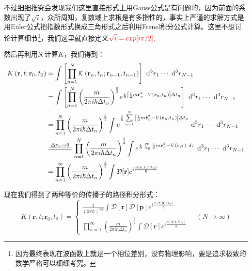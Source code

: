 \documentclass[a4paper,zihao=-4,linespread=1]{ctexrep}
\begin{document}
	不过细细推究会发现我们这里直接形式上用Gauss公式是有问题的，因为前面的系数出现了$\sqrt{i}$，众所周知，复数域上求根是有多指性的，事实上严谨的求解方式是用Euler公式把指数形式换成三角形式之后利用Frenel积分公式计算。这里不想讨论计算细节\footnote{因为最终表现在波函数上就是一个相位差别，没有物理影响，要是追求极致的数学严格可以细细考究。}，我们这里就直接定义${\color{red}\sqrt{i}=exp[i\pi/2]}$.
	
	然后再利用$\mathcal{K}$计算$K$，我们得到：
	\begin{equation}
		\label{eq:6.89}
		\begin{aligned}    K\left( \mathbf{r},t;{{{\mathbf{r}}}_{0}},{{t}_{0}} \right)&=\int{\left[ \prod\limits_{n=1}^{N}{\mathcal{K}\left( {{{\mathbf{r}}}_{n}},{{t}_{n}};{{{\mathbf{r}}}_{n-1}},{{t}_{n-1}} \right)} \right]\mathrm{~d}^3{{{{r}}}_{1}}\cdots \mathrm{~d}^3{{{{r}}}_{N-1}}} \\   & =\int{\left[ \prod\limits_{n=1}^{N}{{{\left( \frac{m}{2\pi i\hbar \Delta {{t}_{n}}} \right)}^{\frac{3}{2}}}{{e}^{\frac{i}{\hbar }\left[ \frac{1}{2}m\dot{\mathbf{r}}_{n}^{2}-V\left( {{{\mathbf{r}}}_{n}},{{t}_{n}} \right) \right]\Delta {{t}_{n}}}}} \right]\mathrm{~d}^3{{{{r}}}_{1}}\cdots \mathrm{~d}^3{{{{r}}}_{N-1}}} \\   & =\prod\limits_{n=1}^{N}{{{\left( \frac{m}{2\pi i\hbar \Delta {{t}_{n}}} \right)}^{\frac{3}{2}}}}\int{{{e}^{\frac{i}{\hbar }\sum\limits_{n=1}^{N}{\left[ \frac{1}{2}m\dot{\mathbf{r}}_{n}^{2}-V\left( {{{\mathbf{r}}}_{n}},{{t}_{n}} \right) \right]\Delta {{t}_{n}}}}}\mathrm{~d}^3{{{{r}}}_{1}}\cdots \mathrm{~d}^3{{{{r}}}_{N-1}}} \\   &  \xlongequal[]{\Delta r_n\to 0}\prod\limits_{n=1}^{N}{{{\left( \frac{m}{2\pi i\hbar \Delta {{t}_{n}}} \right)}^{\frac{3}{2}}}}\int{{{e}^{\frac{i}{\hbar }\int_{{{t}_{0}}}^{t}{\frac{1}{2}m\dot{\mathbf{r}}_{n}^{2}-V\left( \mathbf{r},\tau  \right)\mathrm{~d}\tau }}}\mathrm{~d}^3{{{{r}}}_{1}}\cdots \mathrm{~d}^3{{{{r}}}_{N-1}}} \\   &  =\prod\limits_{n=1}^{\infty}{{{\left( \frac{m}{2\pi i\hbar \Delta {{t}_{n}}} \right)}^{\frac{3}{2}}}}\int{\mathcal{D}[\mathbf{r}]{{e}^{i\frac{S\left( \mathbf{r},\dot{\mathbf{r}},t;t_0 \right)}{\hbar }}}} \\  \end{aligned}
	\end{equation}
	
	现在我们得到了两种等价的传播子的路径积分形式：
	\begin{equation}
		\label{eq:6.90}
		K\left( \mathbf{r},t;{{{\mathbf{r}}}_{0}},{{t}_{0}} \right)=\begin{cases}
			\frac{1}{(2 \pi \hbar)^{3 N}} \int \mathcal{D} [\mathbf{r}] \mathcal{D} [\mathbf{p}]e^{i \frac{S\left(\mathbf{r},\mathbf{p}, t;t_0\right)}{\hbar}}
			\\
			\prod\limits_{n=1}^{\infty}{{{\left( \frac{m}{2\pi i\hbar \Delta {{t}_{n}}} \right)}^{\frac{3}{2}}}}\int{\mathcal{D}[\mathbf{r}]{{e}^{i\frac{S\left( \mathbf{r},\dot{\mathbf{r}},t;t_0 \right)}{\hbar }}}} 
		\end{cases}\quad(N\to \infty)
	\end{equation}
\end{document}
